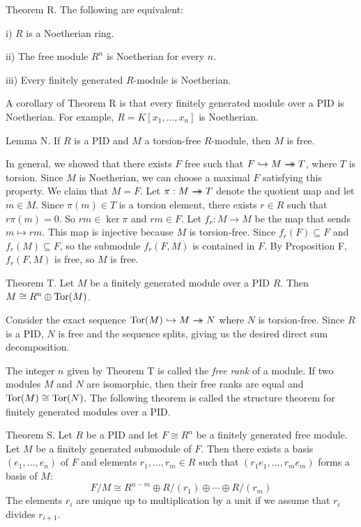 \proclaim Theorem R. The following are equivalent:
\medskip
\item{i)} $R$ is a Noetherian ring.
\smallskip
\item{ii)} The free module $R^n$ is Noetherian for every $n$.
\smallskip
\item{iii)} Every finitely generated $R$-module is Noetherian.\noskipslug
\medskip

A corollary of Theorem R is that every finitely generated module over a PID is Noetherian. For example, $R = K[x_1,\ldots,x_n]$ is Noetherian.

\proclaim Lemma N. If $R$ is a PID and $M$ a torsion-free $R$-module, then $M$ is free.

\proof In general, we showed that there exists $F$ free such that $F\hookrightarrow M \rightarrow\!\!\!\!\!\rightarrow T$, where $T$ is torsion. Since $M$ is Noetherian, we can choose a maximal $F$ satisfying this property. We claim that $M=F$. Let $\pi:M\rightarrow\!\!\!\!\!\rightarrow T$ denote the quotient map and let $m\in M$. Since $\pi(m)\in T$ is a torsion element, there exists $r\in R$ such that $r\pi(m) = 0$. So $rm\in \ker\pi$ and $rm\in F$. Let $f_r : M \to M$ be the map that sends $m\mapsto rm$. This map is injective because $M$ is torsion-free. Since $f_r(F) \subseteq F$ and $f_r(M) \subseteq F$, so the submodule $f_r(F,M)$ is contained in $F$. By Proposition F, $f_r(F,M)$ is free, so $M$ is free.\slug

\proclaim Theorem T. Let $M$ be a finitely generated module over a PID $R$. Then $M\cong R^n \oplus \mathop {\rm Tor}(M)$.

\proof Consider the exact sequence $\mathop {\rm Tor}(M)\hookrightarrow M\rightarrow\!\!\!\!\!\rightarrow N$ where $N$ is torsion-free. Since $R$ is a PID, $N$ is free and the sequence splits, giving us the desired direct sum decomposition.\slug

The integer $n$ given by Theorem T is called the {\it free rank} of a module. If two modules $M$ and $N$ are isomorphic, then their free ranks are equal and $\mathop {\rm Tor}(M)\cong \mathop {\rm Tor}(N)$. The following theorem is called the structure theorem for finitely generated modules over a PID.

\proclaim Theorem S. Let $R$ be a PID and let $F \cong R^n$ be a finitely generated free module. Let $M$ be a finitely generated submodule of $F$. Then there exists a basis $(e_1,\ldots, e_n)$ of $F$ and elements $r_1,\ldots,r_m\in R$ such that $(r_1e_1,\ldots,r_me_m)$ forms a basis of $M$:
$$F/M \cong R^{n-m} \oplus R/(r_1) \oplus \cdots \oplus R/(r_m)$$
The elements $r_i$ are unique up to multiplication by a unit if we assume that $r_i$ divides $r_{i+1}$.\slug

